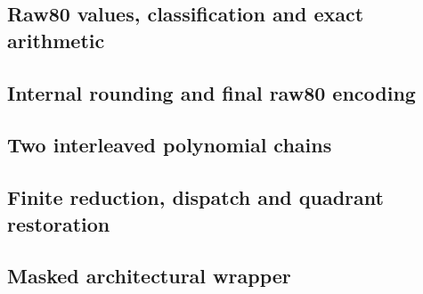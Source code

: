 \subsection{Raw80 values, classification and exact arithmetic}
\par\noindent\begin{minipage}{\linewidth}

\end{minipage}\par
\par\noindent\begin{minipage}{\linewidth}

\end{minipage}\par
\subsection{Internal rounding and final raw80 encoding}
\par\noindent\begin{minipage}{\linewidth}

\end{minipage}\par
\par\noindent\begin{minipage}{\linewidth}

\end{minipage}\par
\subsection{Two interleaved polynomial chains}
\par\noindent\begin{minipage}{\linewidth}

\end{minipage}\par
\subsection{Finite reduction, dispatch and quadrant restoration}
\par\noindent\begin{minipage}{\linewidth}

\end{minipage}\par
\subsection{Masked architectural wrapper}
\par\noindent\begin{minipage}{\linewidth}

\end{minipage}\par
